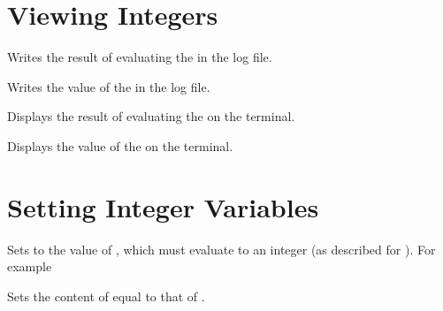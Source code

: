 \documentclass[oneside]{book}
\begin{document}
\section{Viewing Integers}

\begin{function}{\IntLog}
\begin{syntax}
 
\end{syntax}
Writes the result of evaluating the 
in the log file.
\end{function}

\begin{function}{\IntVarLog}
\begin{syntax}
 
\end{syntax}
Writes the value of the  in the log file.
\end{function}

\begin{function}{\IntShow}
\begin{syntax}
 
\end{syntax}
Displays the result of evaluating the 
on the terminal.
\end{function}

\begin{function}{\IntVarShow}
\begin{syntax}
 
\end{syntax}
Displays the value of the  on the terminal.
\end{function}

\section{Setting Integer Variables}

\begin{function}{\IntSet}
\begin{syntax}
  
\end{syntax}
Sets  to the value of ,
which must evaluate to an integer (as described for ).
For example
\begin{demohigh}
\IntSet {}
\IntUse \lTmpaInt
\end{demohigh}
\end{function}

\begin{function}{\IntSetEq}
\begin{syntax}
  
\end{syntax}
Sets the content of  equal to that of
.
\end{function}
\end{document}
